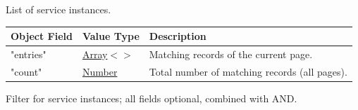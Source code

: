 \documentclass[a4paper]{arrowhead}
\newcommand{\mref}[2][]{{\textcolor{ArrowheadPurple}{\hyperref[sec:model:#2]{\ifstrempty{#1}{#2}{#1}}}}}
\newcommand{\pref}[1]{{\textcolor{ArrowheadGrey}{\hyperref[sec:model:primitives:#1]{#1}}}}
\begin{document}

List of service instances.


\noindent\begin{tabularx}{\textwidth}{| >{\raggedright\arraybackslash}p{3.9cm} | >{\raggedright\arraybackslash\small}p{5.3cm} | X |} \hline
\rowcolor{gray!33} Object Field & Value Type & Description \\ \hline
"entries" & \pref{Array}$<$\allowbreak{}\mref{ServiceInstanceResponse}$>$ & Matching records of the current page. \\ \hline
"count" & \pref{Number} & Total number of matching records (all pages). \\ \hline
\end{tabularx}




Filter for service instances; all fields optional, combined with AND.
\end{document}

